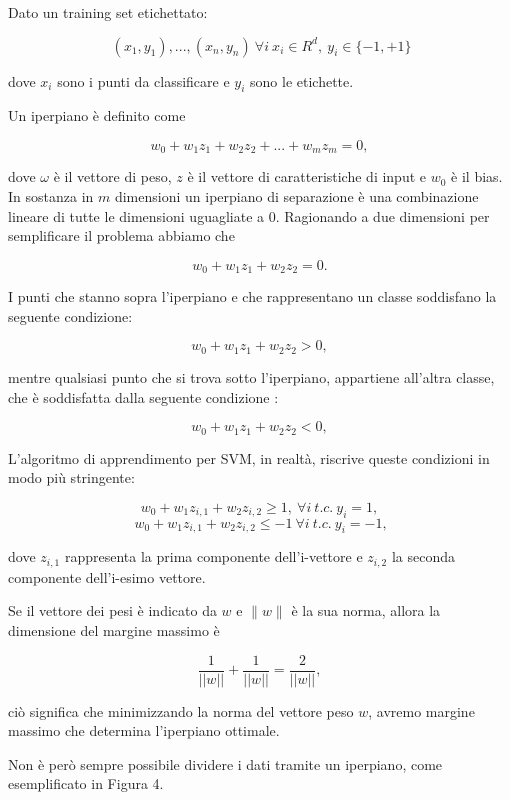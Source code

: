 \documentclass[12pt,italian]{report}
\begin{document}
Dato un training set etichettato:

\begin{center}
	\[
	\ (x_1, y_1), ..., (x_n, y_n)
	\ \forall i 
	\ x_i \in R^{d},
	\ y_i \in  \{ -1, +1 \}
	\]
\end{center}
dove $x_i$ sono i punti da classificare e $y_i$ sono le etichette.

Un iperpiano è definito come 
\begin{center}
	\[w_0 + w_1z_1 + w_2z_2 +...+ w_mz_m= 0,\]
\end{center}
dove $\omega$ è il vettore di peso, $z$ è il vettore di caratteristiche di input e $w_0$ è il bias.
In sostanza in $m$ dimensioni un iperpiano di separazione è una combinazione lineare di tutte le dimensioni uguagliate a 0.
Ragionando a due dimensioni per semplificare il problema abbiamo che 
\begin{center}
	\[w_0 + w_1z_1 + w_2z_2 = 0.\]
\end{center}
I punti che stanno sopra l'iperpiano e che rappresentano un classe soddisfano la seguente condizione:
\begin{center}
	\[w_0 + w_1z_1+w_2z_2 > 0,\]
\end{center}
mentre qualsiasi punto che si trova sotto l'iperpiano, appartiene all'altra classe, che è soddisfatta dalla seguente condizione :
\begin{center}
	\[w_0 + w_1z_1+w_2z_2 < 0,\]
\end{center}
L'algoritmo di apprendimento per SVM, in realtà, riscrive queste condizioni in modo più stringente:
\begin{center}
	\[w_0 + w_1z_{i,1}+w_2z_{i,2} \geq 1,
	\ \forall i 
	\ t.c. 
	\ y_i=1,\]
	\[
	\ w_0 + w_1z_{i,1}+w_2z_{i,2} \leq -1 
	\ \forall i 
	\ t.c.
	\ y_i = -1,\]
\end{center}
dove $z_{i,1}$ rappresenta la prima componente dell'i-vettore e $z_{i,2}$ la seconda componente dell'i-esimo vettore.

Se il vettore dei pesi è indicato da $w$ e $\parallel w \parallel$ è la sua norma, allora la dimensione del margine massimo è 
\begin{center}
	\[ \frac{1}{\left || w \right ||} + \frac{1}{\left || w \right ||} = \frac{2}{\left || w \right ||},\]
\end{center}
ciò significa che minimizzando la norma del vettore peso $w$, avremo margine massimo che determina l'iperpiano ottimale.

Non è però sempre possibile dividere i dati tramite un iperpiano, come esemplificato in Figura 4.
\end{document}
